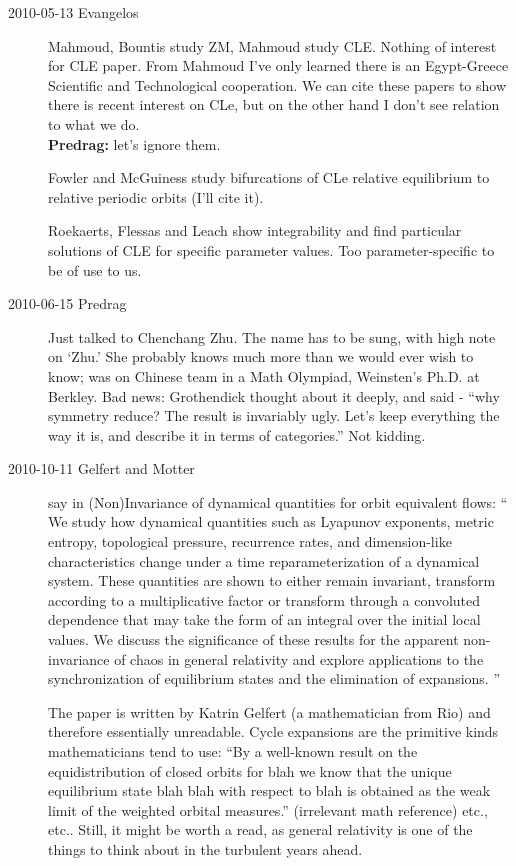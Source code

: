 \begin{description}
\item[2010-05-13  Evangelos]

Mahmoud, Bountis \etal{} study ZM, Mahmoud
\etal{} study CLE. Nothing of interest for CLE paper. From
Mahmoud \etal{} I've only learned there is an Egypt-Greece
Scientific and Technological cooperation. We can cite these papers to
show there is recent interest on CLe, but on the other hand I don't see
relation to what we do.
\\
{\bf Predrag:} let's ignore them.

Fowler and McGuiness study bifurcations of CLe relative equilibrium
to relative periodic orbits (I'll cite it).

Roekaerts, Flessas and Leach show integrability
and find particular solutions of CLE for specific parameter values.
Too parameter-specific to be of use to us.


\item[2010-06-15 Predrag] Just talked to
{Chenchang Zhu}. The name has to be sung, with high note on `Zhu.'
She probably knows much more than we would ever wish to know;
was on Chinese team in a Math Olympiad, Weinsten's Ph.D. at Berkley.
Bad news: Grothendick thought about it deeply, and said
													\toCB
 - ``why
symmetry reduce? The result is invariably ugly. Let's keep everything
the way it is, and describe it in terms of categories.'' Not kidding.

\item[2010-10-11 Gelfert and Motter] say in
 {(Non)Invariance}  of dynamical
quantities for orbit equivalent flows: `` We study how dynamical
quantities such as Lyapunov exponents, metric entropy, topological
pressure, recurrence rates, and dimension-like characteristics change
under a time reparameterization of a dynamical system. These quantities
are shown to either remain invariant, transform according to a
multiplicative factor or transform through a convoluted dependence that
may take the form of an integral over the initial local values. We
discuss the significance of these results for the apparent non-invariance
of chaos in general relativity and explore applications to the
synchronization of equilibrium states and the elimination of expansions.
''

The paper is written by
{Katrin Gelfert} (a mathematician from Rio) and therefore essentially unreadable.
 Cycle expansions are the primitive kinds mathematicians tend to use:
``By a well-known result on the equidistribution of closed orbits for blah
we know that the unique equilibrium state blah blah with respect to blah
is obtained as the weak limit of the weighted orbital measures.''
(irrelevant math reference) etc., etc.. Still, it might be worth a read, as
general relativity is one of the things to think about in the
turbulent years ahead.


\end{description}
